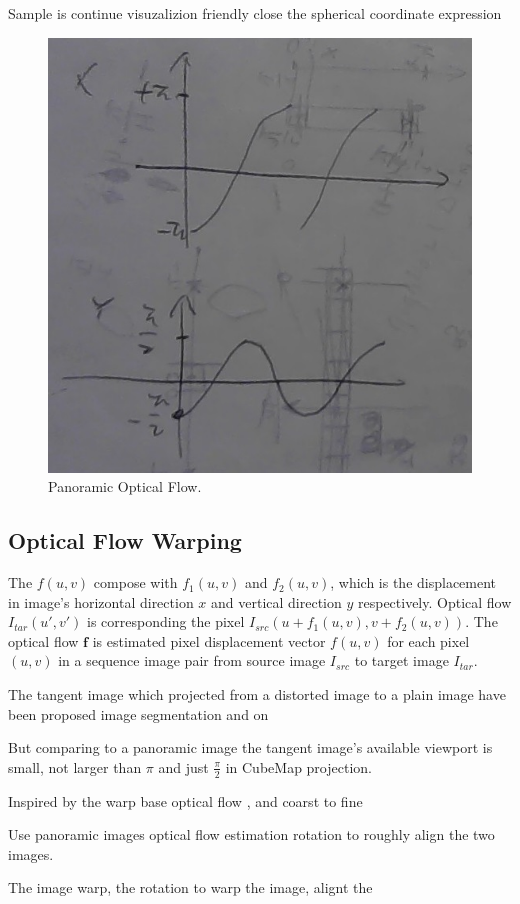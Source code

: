 Sample is continue 
visuzalizion friendly
close the spherical coordinate expression

\begin{figure}[hbt!]
	\centering
	\includegraphics[width=0.45\linewidth]{images/wrap-around-0.jpg}
	\caption{Panoramic Optical Flow.}
	\label{fig:app:warparound}
\end{figure}


\subsection{Optical Flow Warping}\label{sec:approach:warping}


The $f(u,v)$ compose with $f_1(u,v)$ and $f_2(u,v)$, which is the displacement in image's horizontal direction $x$ and vertical direction $y$ respectively.
Optical flow 
$I_{tar}(u',v')$ is corresponding the pixel $I_{src}(u + f_1(u,v), v + f_2(u,v))$.
The optical flow $\textbf{f}$ is estimated pixel displacement vector $f(u,v)$ for each pixel $(u,v)$ in a sequence image pair from source image $I_{src}$ to target image $I_{tar}$.

The tangent image which projected from a distorted image to a plain image have been proposed image segmentation and on ~\cite{eldercvpr2020}

But comparing to a panoramic image the tangent image's available viewport is small, not larger than $\pi$ and just $\frac{\pi}{2}$ in CubeMap projection.

Inspired by the warp base optical flow \cite{?}, and coarst to fine 

Use panoramic images optical flow estimation rotation to roughly align the two images.


The image warp, the rotation to warp the image, alignt the 

